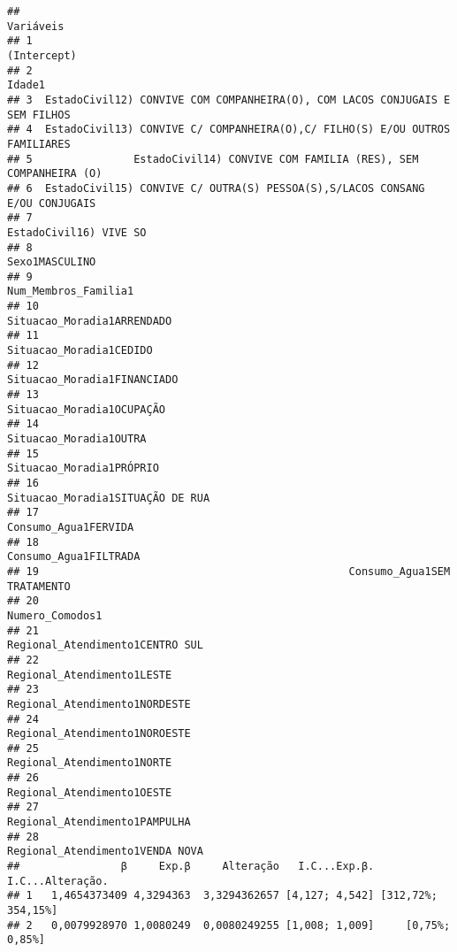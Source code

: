\documentclass[
]{article}
\begin{document}
\begin{verbatim}
##                                                                      Variáveis
## 1                                                                  (Intercept)
## 2                                                                       Idade1
## 3  EstadoCivil12) CONVIVE COM COMPANHEIRA(O), COM LACOS CONJUGAIS E SEM FILHOS
## 4  EstadoCivil13) CONVIVE C/ COMPANHEIRA(O),C/ FILHO(S) E/OU OUTROS FAMILIARES
## 5                EstadoCivil14) CONVIVE COM FAMILIA (RES), SEM COMPANHEIRA (O)
## 6  EstadoCivil15) CONVIVE C/ OUTRA(S) PESSOA(S),S/LACOS CONSANG E/OU CONJUGAIS
## 7                                                       EstadoCivil16) VIVE SO
## 8                                                               Sexo1MASCULINO
## 9                                                         Num_Membros_Familia1
## 10                                                  Situacao_Moradia1ARRENDADO
## 11                                                     Situacao_Moradia1CEDIDO
## 12                                                 Situacao_Moradia1FINANCIADO
## 13                                                   Situacao_Moradia1OCUPAÇÃO
## 14                                                      Situacao_Moradia1OUTRA
## 15                                                    Situacao_Moradia1PRÓPRIO
## 16                                            Situacao_Moradia1SITUAÇÃO DE RUA
## 17                                                        Consumo_Agua1FERVIDA
## 18                                                       Consumo_Agua1FILTRADA
## 19                                                 Consumo_Agua1SEM TRATAMENTO
## 20                                                             Numero_Comodos1
## 21                                             Regional_Atendimento1CENTRO SUL
## 22                                                  Regional_Atendimento1LESTE
## 23                                               Regional_Atendimento1NORDESTE
## 24                                               Regional_Atendimento1NOROESTE
## 25                                                  Regional_Atendimento1NORTE
## 26                                                  Regional_Atendimento1OESTE
## 27                                               Regional_Atendimento1PAMPULHA
## 28                                             Regional_Atendimento1VENDA NOVA
##                β     Exp.β     Alteração   I.C...Exp.β.   I.C...Alteração.
## 1   1,4654373409 4,3294363  3,3294362657 [4,127; 4,542] [312,72%; 354,15%]
## 2   0,0079928970 1,0080249  0,0080249255 [1,008; 1,009]     [0,75%; 0,85%]

\end{verbatim}
\end{document}
